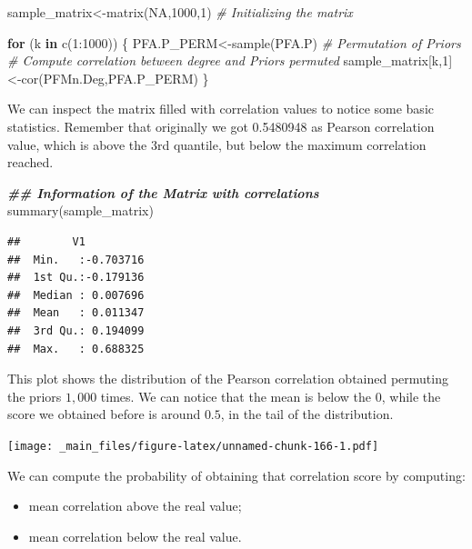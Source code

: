 \documentclass[
  notitlepage,
  onecolumn,
  openany]{book}
\newenvironment{Shaded}{\begin{snugshade}}{\end{snugshade}}
\newcommand{\CommentTok}[1]{\textcolor[rgb]{0.56,0.35,0.01}{\textit{#1}}}
\newcommand{\ConstantTok}[1]{\textcolor[rgb]{0.00,0.00,0.00}{#1}}
\newcommand{\ControlFlowTok}[1]{\textcolor[rgb]{0.13,0.29,0.53}{\textbf{#1}}}
\newcommand{\DecValTok}[1]{\textcolor[rgb]{0.00,0.00,0.81}{#1}}
\newcommand{\DocumentationTok}[1]{\textcolor[rgb]{0.56,0.35,0.01}{\textbf{\textit{#1}}}}
\newcommand{\FunctionTok}[1]{\textcolor[rgb]{0.00,0.00,0.00}{#1}}
\newcommand{\NormalTok}[1]{#1}
\newcommand{\OtherTok}[1]{\textcolor[rgb]{0.56,0.35,0.01}{#1}}
\newcommand{\SpecialCharTok}[1]{\textcolor[rgb]{0.00,0.00,0.00}{#1}}
\providecommand{\tightlist}{%
  \setlength{\itemsep}{0pt}\setlength{\parskip}{0pt}}
\begin{document}
\begin{Shaded}
\begin{Highlighting}[]
\NormalTok{sample\_matrix}\OtherTok{\textless{}{-}}\FunctionTok{matrix}\NormalTok{(}\ConstantTok{NA}\NormalTok{,}\DecValTok{1000}\NormalTok{,}\DecValTok{1}\NormalTok{) }\CommentTok{\# Initializing the matrix}

\ControlFlowTok{for}\NormalTok{ (k }\ControlFlowTok{in} \FunctionTok{c}\NormalTok{(}\DecValTok{1}\SpecialCharTok{:}\DecValTok{1000}\NormalTok{))}
\NormalTok{\{}
\NormalTok{  PFA.P\_PERM}\OtherTok{\textless{}{-}}\FunctionTok{sample}\NormalTok{(PFA.P) }\CommentTok{\# Permutation of Priors}
  \CommentTok{\# Compute correlation between degree and Priors permuted}
\NormalTok{  sample\_matrix[k,}\DecValTok{1}\NormalTok{]}\OtherTok{\textless{}{-}}\FunctionTok{cor}\NormalTok{(PFMn.Deg,PFA.P\_PERM) }
\NormalTok{\}}
\end{Highlighting}
\end{Shaded}

We can inspect the matrix filled with correlation values to notice some basic statistics. Remember that originally we got 0.5480948 as Pearson correlation value, which is above the 3rd quantile, but below the maximum correlation reached.

\begin{Shaded}
\begin{Highlighting}[]
\DocumentationTok{\#\# Information of the Matrix with correlations}
\FunctionTok{summary}\NormalTok{(sample\_matrix)}
\end{Highlighting}
\end{Shaded}

\begin{verbatim}
##        V1           
##  Min.   :-0.703716  
##  1st Qu.:-0.179136  
##  Median : 0.007696  
##  Mean   : 0.011347  
##  3rd Qu.: 0.194099  
##  Max.   : 0.688325
\end{verbatim}

This plot shows the distribution of the Pearson correlation obtained permuting the priors \(1,000\) times. We can notice that the mean is below the \(0\), while the score we obtained before is around \(0.5\), in the tail of the distribution.

\texttt{[image: \_main\_files/figure-latex/unnamed-chunk-166-1.pdf]}

We can compute the probability of obtaining that correlation score by computing:

\begin{itemize}
\tightlist
\item
  mean correlation above the real value;
\item
  mean correlation below the real value.
\end{itemize}
\end{document}
